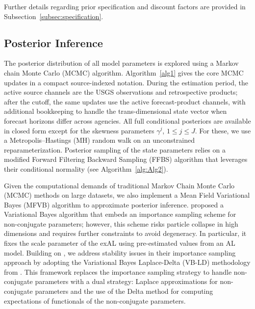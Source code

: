 \documentclass[APA,STIX1COL]{WileyNJD-v2}
\begin{document}
Further details regarding prior specification and discount factors are provided in Subsection~\ref{subsec:specification}.

\subsection{Posterior Inference}
\label{subsec:postinf}
The posterior distribution of all model parameters is explored using a Markov chain Monte Carlo (MCMC) algorithm.
Algorithm~\ref{alg1} gives the core MCMC updates in a compact source-indexed notation. During the estimation period, the active source channels are the USGS observations and retrospective products; after the cutoff, the same updates use the active forecast-product channels, with additional bookkeeping to handle the trans-dimensional state vector when forecast horizons differ across agencies. All full conditional posteriors are available in closed form except for the skewness parameters $\gamma^j$, $1 \leq j \leq J$. For these, we use a Metropolis--Hastings (MH) random walk on an unconstrained reparameterization. Posterior sampling of the state parameters relies on a modified Forward Filtering Backward Sampling (FFBS) algorithm that leverages their conditional normality (see Algorithm~\ref{alg:Alg2}).


Given the computational demands of traditional Markov Chain Monte Carlo (MCMC) methods on large datasets, we also implement a Mean Field Variational Bayes (MFVB) algorithm to approximate posterior inference.
\citet{barata2021_flex_quantile} proposed a Variational Bayes algorithm that embeds an importance sampling scheme for non-conjugate parameters; however, this scheme risks particle collapse in high dimensions and requires further constraints to avoid degeneracy. In particular, it fixes the scale parameter of the exAL using pre-estimated values from an AL model. 
Building on \citet{barata2021_flex_quantile}, we address stability issues in their importance sampling approach by adopting the Variational Bayes Laplace-Delta (VB-LD) methodology from \citet{wang2013nonconjugatevb}. This framework replaces the importance sampling strategy to handle non-conjugate parameters with a dual strategy: Laplace approximations for non-conjugate parameters and the use of the Delta method for computing expectations of functionals of the non-conjugate parameters.
\end{document}
